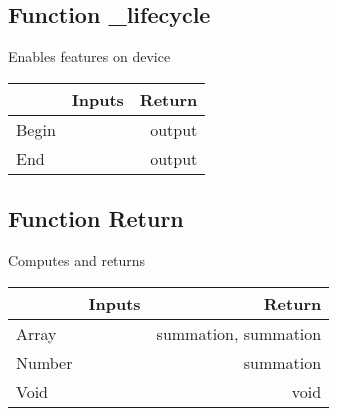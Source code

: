 \documentclass[a4paper,12pt,oneside,pdflatex,italian,final,twocolumn]{article}
\begin{document}
\raggedright
\subsection{Function _lifecycle }
Enables features on device \\

\centering
\begin{tabular}{lcr}
\toprule
  & Inputs & Return \\
\midrule
Begin &
&
output
\\
End &
&
output
\\
\bottomrule
\end{tabular}



\raggedright
\subsection{Function Return }
Computes and returns \\

\centering
\begin{tabular}{lcr}
\toprule
  & Inputs & Return \\
\midrule
Array &
&
summation, 
summation
\\
Number &
&
summation
\\
Void &
&
void
\\
\bottomrule
\end{tabular}



\raggedright
\end{document}
